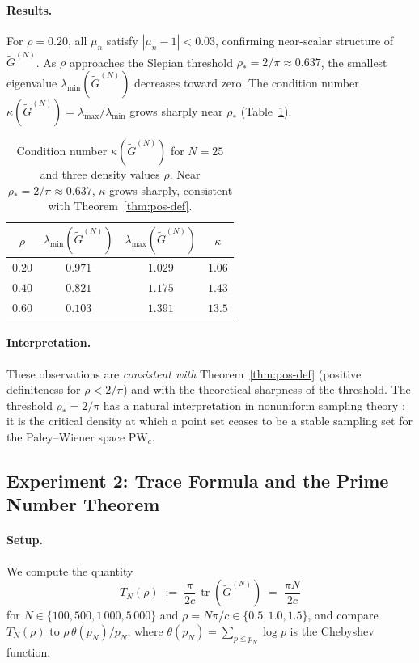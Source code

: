 \documentclass[12pt,a4paper]{amsart}
\theoremstyle{definition}
\newcommand{\tr}{\operatorname{tr}}
\begin{document}
\paragraph{Results.}
For $\rho = 0.20$, all $\mu_n$ satisfy $|\mu_n - 1| < 0.03$,
confirming near-scalar structure of $\widetilde{G}^{(N)}$.
As $\rho$ approaches the Slepian threshold $\rho_* = 2/\pi
\approx 0.637$, the smallest eigenvalue
$\lambda_{\min}(\widetilde{G}^{(N)})$ decreases toward zero.
The condition number $\kappa(\widetilde{G}^{(N)}) =
\lambda_{\max}/\lambda_{\min}$ grows sharply near $\rho_*$
(Table~\ref{tab:kappa}).

\begin{table}[h]
\centering
\renewcommand{\arraystretch}{1.3}
\begin{tabular}{cccc}
\hline
$\rho$ & $\lambda_{\min}(\widetilde{G}^{(N)})$ &
$\lambda_{\max}(\widetilde{G}^{(N)})$ & $\kappa$ \\
\hline
$0.20$ & $0.971$ & $1.029$ & $1.06$ \\
$0.40$ & $0.821$ & $1.175$ & $1.43$ \\
$0.60$ & $0.103$ & $1.391$ & $13.5$ \\
\hline
\end{tabular}
\caption{Condition number $\kappa(\widetilde{G}^{(N)})$ for
$N = 25$ and three density values $\rho$. Near $\rho_* = 2/\pi
\approx 0.637$, $\kappa$ grows sharply, consistent with
Theorem~\ref{thm:pos-def}.}
\label{tab:kappa}
\end{table}

\paragraph{Interpretation.}
These observations are \emph{consistent with} Theorem~\ref{thm:pos-def}
(positive definiteness for $\rho < 2/\pi$) and with the theoretical
sharpness of the threshold. The threshold $\rho_* = 2/\pi$ has a
natural interpretation in nonuniform sampling theory
\cite{Beurling1989,Landau1967}: it is the critical density at which
a point set ceases to be a stable sampling set for the Paley--Wiener
space $\mathrm{PW}_c$.

\subsection{Experiment 2: Trace Formula and the Prime Number Theorem}
\label{ssec:exp2}

\paragraph{Setup.}
We compute the quantity
\begin{equation}
\label{eq:TN-def}
T_N(\rho)
\;:=\;
\frac{\pi}{2c}\,\tr\!\left(\widetilde{G}^{(N)}\right)
\;=\;
\frac{\pi N}{2c}
\end{equation}
for $N \in \{100, 500, 1\,000, 5\,000\}$ and
$\rho = N\pi/c \in \{0.5, 1.0, 1.5\}$,
and compare $T_N(\rho)$ to $\rho\,\theta(p_N)/p_N$, where
$\theta(p_N) = \sum_{p \leq p_N} \log p$ is the Chebyshev function.
\end{document}
